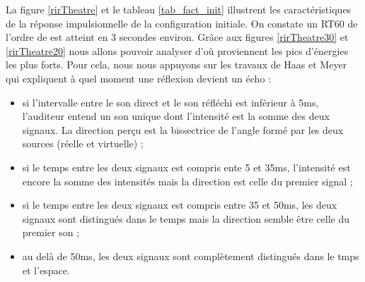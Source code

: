 La figure \ref{rirTheatre} et le tableau \ref{tab_fact_init} illustrent les caractéristiques de  la réponse impulsionnelle de la configuration initiale. On constate un \gls{RT60} de l'ordre de est atteint en 3 secondes environ. Grâce aux figures \ref{rirTheatre30} et \ref{rirTheatre20} nous allons pouvoir analyser d'où proviennent les pics d'énergies les plus forts. Pour cela, nous nous appuyons sur les travaux de Haas et Meyer \cite[p.49]{haas} qui expliquent à quel moment une réflexion devient un écho :
\begin{itemize}
\item si l'intervalle entre le son direct et le son réfléchi est inférieur à 5ms, l'auditeur entend un son unique dont l'intensité est la somme des deux signaux. La direction perçu est la bissectrice de l'angle formé par les deux sources (réelle et virtuelle) ;
\item si le temps entre les deux signaux est compris ente 5 et 35ms, l'intensité est encore la somme des intensités mais la direction est celle du premier signal ;
\item si le temps entre les deux signaux est compris entre 35 et 50ms, les deux signaux sont distingués dans le temps mais la direction semble être celle du premier son ;
\item au delà de 50ms, les deux signaux sont complètement distingués dans le tmps et l'espace.
\end{itemize}
